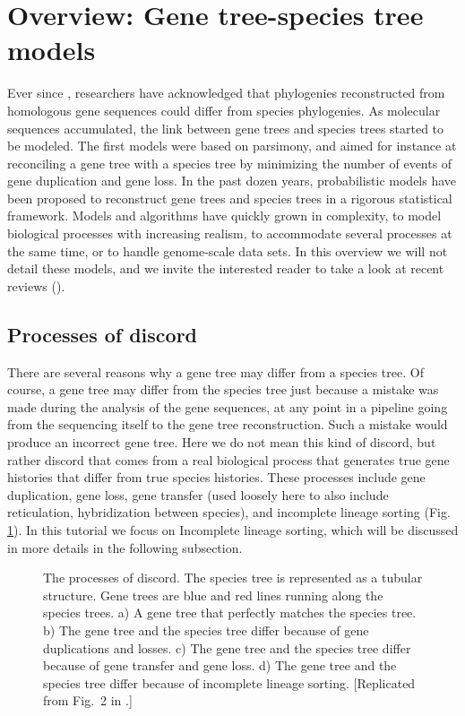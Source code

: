 \section{Overview: Gene tree-species tree models}

Ever since \cite{Zuckerkandl1965a}, researchers have acknowledged that phylogenies reconstructed from homologous gene sequences could differ from species phylogenies.
As molecular sequences accumulated, the link between gene trees and species trees started to be modeled. 
The first models were based on parsimony, and aimed for instance at reconciling a gene tree with a species tree by minimizing the number of events of gene duplication and gene loss. 
In the past dozen years, probabilistic models have been proposed to reconstruct gene trees and species trees in a rigorous statistical framework.
Models and algorithms have quickly grown in complexity, to model biological processes with increasing realism, to accommodate several processes at the same time, or to handle genome-scale data sets.
In this overview we will not detail these models, and we invite the interested reader to take a look at recent reviews (\EG \citep{Szollosi28072014}).

\subsection{Processes of discord}
There are several reasons why a gene tree may differ from a species tree. 
Of course, a gene tree may differ from the species tree just because a mistake was made during the analysis of the gene sequences, at any point in a pipeline going from the sequencing itself to the gene tree reconstruction.
Such a mistake would produce an incorrect gene tree.
Here we do not mean this kind of discord, but rather discord that comes from a real biological process that generates true gene histories that differ from true species histories.
These processes include gene duplication, gene loss, gene transfer (used loosely here to also include reticulation, hybridization between species), and incomplete lineage sorting (Fig. \ref{fig1}). 
In this tutorial we focus on Incomplete lineage sorting, which will be discussed in more details in the following subsection.

\begin{figure}[h!]
\centering
{}
\caption{\small The processes of discord. The species tree is represented as a tubular structure. Gene trees are blue and red lines running along the species trees. a) A gene tree that perfectly matches the species tree. b) The gene tree and the species tree differ because of gene duplications and losses. c)  The gene tree and the species tree differ because of gene transfer and gene loss. d)  The gene tree and the species tree differ because of incomplete lineage sorting.   [Replicated from Fig.~2 in \citet{Boussau2009}.]}
\label{fig1}
\end{figure}

